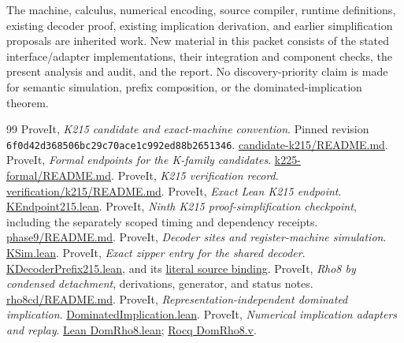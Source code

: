 \documentclass[11pt,letterpaper]{article}
\theoremstyle{definition}\newtheorem{definition}[theorem]{Definition}
\theoremstyle{remark}\newtheorem{remark}[theorem]{Remark}
\newcommand{\Baseline}{\texttt{6f0d42d368506bc29c70ace1c992ed88b2651346}}
\newcommand{\PinnedURL}{https://github.com/VladimirReshetnikov/ProveIt/blob/6f0d42d368506bc29c70ace1c992ed88b2651346}
\begin{document}
The machine, calculus, numerical encoding, source compiler, runtime definitions, existing decoder proof, existing implication derivation, and earlier simplification proposals are inherited work. New material in this packet consists of the stated interface/adapter implementations, their integration and component checks, the present analysis and audit, and the report. No discovery-priority claim is made for semantic simulation, prefix composition, or the dominated-implication theorem.

\clearpage
\begin{thebibliography}{99}\small
{} ProveIt, \emph{K215 candidate and exact-machine convention}. Pinned revision \Baseline. \href{\PinnedURL/Computability/BusyBeaver/Research/ZFC/candidate-k215/README.md}{candidate-k215/README.md}.
 ProveIt, \emph{Formal endpoints for the K-family candidates}. \href{\PinnedURL/Computability/BusyBeaver/Research/ZFC/k225-formal/README.md}{k225-formal/README.md}.
 ProveIt, \emph{K215 verification record}. \href{\PinnedURL/Computability/BusyBeaver/Research/ZFC/k225-formal/verification/k215/README.md}{verification/k215/README.md}.
 ProveIt, \emph{Exact Lean K215 endpoint}. \href{\PinnedURL/Computability/BusyBeaver/Lean/BusyBeaver/ZFC/KEndpoint215.lean}{KEndpoint215.lean}.
 ProveIt, \emph{Ninth K215 proof-simplification checkpoint}, including the separately scoped timing and dependency receipts. \href{\PinnedURL/Computability/BusyBeaver/Research/ZFC/k225-formal/verification/k215/simplification/phase9/README.md}{phase9/README.md}.
 ProveIt, \emph{Decoder sites and register-machine simulation}. \href{\PinnedURL/Computability/BusyBeaver/Lean/BusyBeaver/ZFC/KSim.lean}{KSim.lean}.
 ProveIt, \emph{Exact zipper entry for the shared decoder}. \href{\PinnedURL/Computability/BusyBeaver/Lean/BusyBeaver/ZFC/KDecoderPrefix215.lean}{KDecoderPrefix215.lean}, and its \href{\PinnedURL/Computability/BusyBeaver/Lean/BusyBeaver/ZFC/DecoderSourceBinding.lean}{literal source binding}.
 ProveIt, \emph{Rho8 by condensed detachment}, derivations, generator, and status notes. \href{\PinnedURL/Computability/BusyBeaver/Research/ZFC/k225-formal/rho8cd/README.md}{rho8cd/README.md}.
 ProveIt, \emph{Representation-independent dominated implication}. \href{\PinnedURL/Computability/BusyBeaver/Lean/BusyBeaver/ZFC/DominatedImplication.lean}{DominatedImplication.lean}.
 ProveIt, \emph{Numerical implication adapters and replay}. \href{\PinnedURL/Computability/BusyBeaver/Lean/BusyBeaver/ZFC/DomRho8.lean}{Lean DomRho8.lean}; \href{\PinnedURL/Computability/BusyBeaver/Research/ZFC/k225-formal/rocq/rocq-extension/coq/215/DomRho8.v}{Rocq DomRho8.v}.

\end{thebibliography}
\end{document}
